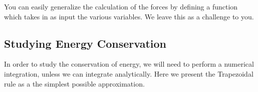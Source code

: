 \documentclass[letterpaper,10pt,english]{sphinxmanual}
\begin{document}
\begin{sphinxVerbatim}[commandchars=\\\{\}]
      \PYG{p}{[}\PYG{p}{]}
    \PYG{p}{[}\PYG{p}{]}  \PYG{p}{[}\PYG{p}{]}  
    \PYG{p}{[}\PYG{p}{]}  \PYG{p}{[}\PYG{p}{]}  
   
\PYG{p}{[}\PYG{p}{]} \PYG{p}{[}\PYG{p}{]}
\end{sphinxVerbatim}

\noindent{}

You can easily generalize the calculation of the forces by defining a function
which takes in as input the various variables. We leave this as a challenge to you.


\subsection{Studying Energy Conservation}
\label{\detokenize{chapter3:studying-energy-conservation}}
In order to study the conservation of energy, we will need to perform
a numerical integration, unless we can integrate analytically. Here we
present the Trapezoidal rule as a the simplest possible approximation.
\end{document}
